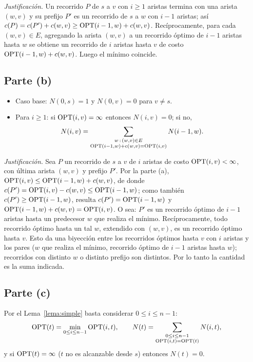 \emph{Justificación.} Un recorrido $P$ de $s$ a $v$ con $i\ge1$ aristas termina con una arista $(w,v)$ y su
prefijo $P'$ es un recorrido de $s$ a $w$ con $i-1$ aristas; así $c(P)=c(P')+c(w,v)\ge
\mathrm{OPT}(i-1,w)+c(w,v)$. Recíprocamente, para cada $(w,v)\in E$, agregando la arista $(w,v)$ a un recorrido
óptimo de $i-1$ aristas hasta $w$ se obtiene un recorrido de $i$ aristas hasta $v$ de costo
$\mathrm{OPT}(i-1,w)+c(w,v)$. Luego el mínimo coincide.

\subsection*{Parte (b)}

\begin{itemize}
\item Caso base: $N(0,s)=1$ y $N(0,v)=0$ para $v\neq s$.
\item Para $i\ge1$: si $\mathrm{OPT}(i,v)=\infty$ entonces $N(i,v)=0$; si no,
\[
N(i,v) = \sum_{\substack{w\,:\,(w,v)\in E\\ \mathrm{OPT}(i-1,w)+c(w,v)=\mathrm{OPT}(i,v)}} N(i-1,w).
\]
\end{itemize}

\emph{Justificación.} Sea $P$ un recorrido de $s$ a $v$ de $i$ aristas de costo $\mathrm{OPT}(i,v)<\infty$, con
última arista $(w,v)$ y prefijo $P'$. Por la parte (a), $\mathrm{OPT}(i,v)\le\mathrm{OPT}(i-1,w)+c(w,v)$, de donde
$c(P')=\mathrm{OPT}(i,v)-c(w,v)\le\mathrm{OPT}(i-1,w)$; como también $c(P')\ge\mathrm{OPT}(i-1,w)$, resulta $c(P')=\mathrm{OPT}(i-1,w)$
y $\mathrm{OPT}(i-1,w)+c(w,v)=\mathrm{OPT}(i,v)$. O sea: $P'$ es un recorrido óptimo de $i-1$ aristas hasta un predecesor
$w$ que realiza el mínimo. Recíprocamente, todo recorrido óptimo hasta un tal $w$, extendido con $(w,v)$, es
un recorrido óptimo hasta $v$. Esto da una biyección entre los recorridos óptimos hasta $v$ con $i$ aristas y
los pares ($w$ que realiza el mínimo, recorrido óptimo de $i-1$ aristas hasta $w$); recorridos con distinto
$w$ o distinto prefijo son distintos. Por lo tanto la cantidad es la suma indicada.

\subsection*{Parte (c)}

Por el Lema~\ref{lema:simple} basta considerar $0\le i\le n-1$:
\[
\mathrm{OPT}(t)=\min_{0\le i\le n-1}\mathrm{OPT}(i,t),
\qquad
N(t)=\sum_{\substack{0\le i\le n-1\\ \mathrm{OPT}(i,t)=\mathrm{OPT}(t)}} N(i,t),
\]
y si $\mathrm{OPT}(t)=\infty$ ($t$ no es alcanzable desde $s$) entonces $N(t)=0$.

